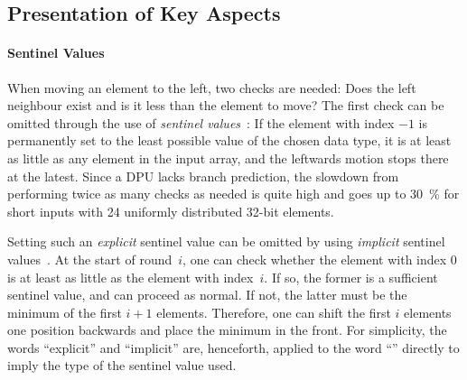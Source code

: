 \subsection{Presentation of Key Aspects}
\label{sec:tasklet:insertion:aspects}

\paragraph{Sentinel Values}
When moving an element to the left, two checks are needed:
Does the left neighbour exist and is it less than the element to move?
The first check can be omitted through the use of \emph{sentinel values}~\cite[93]{wirth1975algorithmen}:
If the element with index \(-1\) is permanently set to the least possible value of the chosen data type, it is at least as little as any element in the input array, and the leftwards motion stops there at the latest.
Since a \ac{DPU} lacks branch prediction, the slowdown from performing twice as many checks as needed is quite high and goes up to \qty{30}{\percent} for short inputs with 24 uniformly distributed 32-bit elements.

Setting such an \emph{explicit} sentinel value can be omitted by using \emph{implicit} sentinel values~\cite{sanders2019sequential}.
At the start of round~\(i\), one can check whether the element with index \(0\) is at least as little as the element with index~\(i\).
If so, the former is a sufficient sentinel value, and \IS{} can proceed as normal.
If not, the latter must be the minimum of the first \(i + 1\) elements.
Therefore, one can shift the first \(i\) elements one position backwards and place the minimum in the front.
For simplicity, the words \enquote{explicit} and \enquote{implicit} are, henceforth, applied to the word \enquote{\IS{}} directly to imply the type of the sentinel value used.
